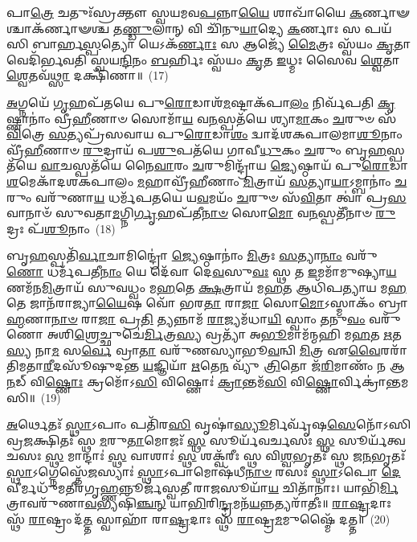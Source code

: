 𑌪𑌾\-\ul{𑌤𑍍𑌰𑍇} 𑌚𑌤𑍁𑌃᳴𑌸𑍍𑌰𑌕𑍍𑌤𑍗 𑌸𑍍𑌵𑌯𑌮𑌵\-\ul{𑌪}\-𑌨𑍍𑌨𑌾\-\ul{𑌯𑍈} 𑌶𑌾𑌖𑌾᳴𑌯𑍈 \ul{𑌕}\-𑌰𑍍𑌣𑌾𑍟𑌶𑍍𑌚𑌾\-𑌕᳴𑌰𑍍𑌣𑌾𑍟𑌶𑍍𑌚 𑌤\-\ul{𑌣𑍍𑌡𑍁}\-𑌲𑌾𑌨𑍍 𑌵𑌿 𑌚𑌿᳴𑌨𑍁\-\ul{𑌯𑌾}\-𑌦𑍍𑌯𑍇 \ul{𑌕}\-𑌰𑍍𑌣𑌾𑌃 𑌸 𑌪𑌯᳴𑌸𑌿 𑌬𑌾𑌰𑍍\mbox{}𑌹\-\ul{𑌸𑍍𑌪}\-𑌤𑍍𑌯𑍋 𑌯𑍇\-𑌽𑌕᳴\-\ul{𑌰𑍍𑌣𑌾𑌃} 𑌸 𑌆𑌜𑍍𑌯𑍇᳴ \ul{𑌮𑍈}\-𑌤𑍍𑌰𑌃 𑌸𑍍𑌵᳴𑌯𑌂 \ul{𑌕𑍃}\-𑌤𑌾 𑌵𑍇𑌦𑌿᳴𑌰𑍍𑌭𑌵𑌤𑌿 𑌸𑍍𑌵𑌯\-\ul{𑌨𑍍𑌦𑌿}\-𑌨𑌂 \ul{𑌬}\-𑌰𑍍\mbox{}𑌹𑌿𑌃 𑌸𑍍𑌵᳴𑌯𑌂 \ul{𑌕𑍃}\-𑌤 \ul{𑌇}\-𑌧𑍍𑌮𑌃 𑌸𑍈𑌵 \ul{𑌶𑍍𑌵𑍇}\-𑌤𑌾 \ul{𑌶𑍍𑌵𑍇}\-𑌤𑌵᳴\-\ul{𑌥𑍍𑌸𑌾} 𑌦𑌕𑍍𑌷𑌿᳴𑌣𑌾॥~(17)


{\anuvakamend[{\-\ul{𑌸𑌾}\-\-\ul{𑌵𑌿}\-𑌤𑍍𑌰𑌂 𑌦𑍍𑌵𑌾𑌦᳴𑌶\-𑌕𑌪𑌾\-\ul{𑌲}\-𑌮𑌾𑌶𑍍𑌵᳴\-\ul{𑌤𑍍𑌥𑍇} 𑌤𑍍𑌰𑌯᳴𑌸𑍍𑌤𑍍𑌰𑌿𑍞𑌶𑌚𑍍𑌚}]}%

\-\ul{𑌅}\-𑌗𑍍𑌨𑌯𑍇᳴ \ul{𑌗𑍃}\-𑌹𑌪᳴𑌤𑌯𑍇 𑌪𑍁\-\ul{𑌰𑍋}\-𑌡𑌾𑌶᳴\-\-\ul{𑌮}\-𑌷𑍍𑌟𑌾\-𑌕᳴𑌪𑌾\-\ul{𑌲𑌂} 𑌨𑌿𑌰𑍍𑌵᳴𑌪𑌤𑌿 \ul{𑌕𑍃}\-𑌷𑍍𑌣𑌾𑌨𑌾𑌂॑ 𑌵𑍍𑌰𑍀\-\ul{𑌹𑍀}\-𑌣𑌾𑍞 𑌸𑍋𑌮𑌾᳴\-\ul{𑌯} 𑌵\-\ul{𑌨}\-𑌸𑍍𑌪𑌤᳴𑌯𑍇 𑌶𑍍𑌯𑌾\-\ul{𑌮𑌾}\-𑌕𑌂 \ul{𑌚}\-𑌰𑍁𑍞 𑌸᳴\-\ul{𑌵𑌿}\-𑌤𑍍𑌰𑍇 \ul{𑌸}\-𑌤𑍍𑌯𑌪𑍍𑌰᳴𑌸𑌵𑌾𑌯 𑌪𑍁\-\ul{𑌰𑍋}\-𑌡𑌾\-\ul{𑌶𑌂} 𑌦𑍍𑌵𑌾𑌦᳴𑌶\-𑌕𑌪𑌾𑌲𑌮𑌾\-\ul{𑌶𑍂}\-𑌨𑌾𑌂 𑌵𑍍𑌰𑍀᳴\-\ul{𑌹𑍀}\-𑌣𑌾𑍞 \ul{𑌰𑍁}\-𑌦𑍍𑌰𑌾𑌯᳴ 𑌪\-\ul{𑌶𑍁}\-𑌪𑌤᳴𑌯𑍇 𑌗𑌾𑌵𑍀\-\ul{𑌧𑍁}\-𑌕𑌂 \ul{𑌚}\-𑌰𑍁𑌂 𑌬𑍃\-\ul{𑌹}\-𑌸𑍍𑌪𑌤᳴𑌯𑍇 \ul{𑌵𑌾}\-𑌚𑌸𑍍𑌪𑌤᳴𑌯𑍇 𑌨𑍈\-\ul{𑌵𑌾}\-𑌰𑌂 \ul{𑌚}\-𑌰𑍁𑌮𑌿𑌨𑍍𑌦𑍍𑌰𑌾᳴𑌯 \ul{𑌜𑍍𑌯𑍇}\-𑌷𑍍𑌠𑌾𑌯᳴ 𑌪𑍁\-\ul{𑌰𑍋}\-𑌡𑌾\-\ul{𑌶}\-𑌮𑍇𑌕𑌾᳴\-𑌦𑌶\-𑌕𑌪𑌾𑌲𑌂 \ul{𑌮}\-𑌹𑌾𑌵𑍍𑌰𑍀᳴𑌹𑍀𑌣𑌾𑌂 \ul{𑌮𑌿}\-𑌤𑍍𑌰𑌾𑌯᳴ \ul{𑌸}\-𑌤𑍍𑌯𑌾\-\ul{𑌯𑌾}\-\-𑌽𑌮𑍍𑌬𑌾𑌨𑌾𑌂॑ \ul{𑌚}\-𑌰𑍁𑌂 𑌵𑌰𑍁᳴𑌣𑌾\-\ul{𑌯} 𑌧𑌰𑍍𑌮᳴𑌪𑌤𑌯𑍇 𑌯\-\ul{𑌵}\-𑌮𑌯𑌂᳴ \ul{𑌚}\-𑌰𑍁𑍞 𑌸᳴\-\ul{𑌵𑌿}\-𑌤𑌾 𑌤𑍍𑌵𑌾॑ 𑌪𑍍𑌰\-\ul{𑌸}\-𑌵𑌾𑌨𑌾𑍞᳴ 𑌸𑍁𑌵𑌤𑌾\-\ul{𑌮}\-𑌗𑍍𑌨𑌿\-\ul{𑌰𑍍𑌗𑍃}\-𑌹𑌪᳴𑌤𑍀\-\ul{𑌨𑌾}\-\-\ul{𑍞} 𑌸𑍋\-\ul{𑌮𑍋} 𑌵\-\ul{𑌨}\-𑌸𑍍𑌪𑌤𑍀᳴𑌨𑌾𑍞 \ul{𑌰𑍁}\-𑌦𑍍𑌰𑌃 𑌪᳴\-\ul{𑌶𑍂}\-𑌨𑌾𑌂~(18)

𑌬𑍃\-\ul{𑌹}\-𑌸𑍍𑌪𑌤𑌿᳴\-\ul{𑌰𑍍𑌵𑌾}\-𑌚𑌾𑌮𑌿𑌨𑍍𑌦𑍍𑌰𑍋॑ \ul{𑌜𑍍𑌯𑍇}\-𑌷𑍍𑌠𑌾𑌨𑌾𑌂॑ \ul{𑌮𑌿}\-𑌤𑍍𑌰𑌃 \ul{𑌸}\-𑌤𑍍𑌯𑌾\-\ul{𑌨𑌾𑌂} 𑌵𑌰𑍁᳴\-\ul{𑌣𑍋} 𑌧𑌰𑍍𑌮᳴𑌪𑌤𑍀\-\ul{𑌨𑌾𑌂} 𑌯𑍇 𑌦𑍇᳴𑌵𑌾 𑌦𑍇\-\ul{𑌵}\-𑌸𑍁\-\ul{𑌵𑌃} 𑌸𑍍𑌥 𑌤 \ul{𑌇}\-𑌮𑌮𑌾᳴𑌮𑍁𑌷𑍍𑌯𑌾\-\ul{𑌯}\-𑌣𑌮᳴\-𑌨\-\ul{𑌮𑌿}\-𑌤𑍍𑌰𑌾𑌯᳴ 𑌸𑍁𑌵𑌧𑍍𑌵𑌂 𑌮\-\ul{𑌹}\-𑌤𑍇 \ul{𑌕𑍍𑌷}\-𑌤𑍍𑌰𑌾𑌯᳴ 𑌮\-\ul{𑌹}\-𑌤 𑌆𑌧𑌿᳴𑌪𑌤𑍍𑌯𑌾𑌯 𑌮\-\ul{𑌹}\-𑌤𑍇 𑌜𑌾𑌨᳴𑌰𑌾𑌜𑍍𑌯𑌾\-\ul{𑌯𑍈}\-𑌷 𑌵𑍋᳴ 𑌭𑌰\-\ul{𑌤𑌾} 𑌰𑌾\-\ul{𑌜𑌾} 𑌸𑍋\-\ul{𑌮𑍋}\-\-𑌽𑌸𑍍𑌮𑌾𑌕𑌂᳴ 𑌬𑍍𑌰𑌾\-\ul{𑌹𑍍𑌮}\-𑌣𑌾\-\ul{𑌨𑌾}\-\-\ul{𑍞} 𑌰𑌾\-\ul{𑌜𑌾} 𑌪𑍍𑌰\-\ul{𑌤𑌿} 𑌤𑍍𑌯𑌨𑍍𑌨𑌾𑌮᳴ \ul{𑌰𑌾}\-𑌜𑍍𑌯𑌮᳴𑌧𑌾\-\ul{𑌯𑌿} 𑌸𑍍𑌵𑌾𑌂 \ul{𑌤}\-𑌨𑍁\-\ul{𑌵𑌂} 𑌵𑌰𑍁᳴𑌣𑍋 𑌅𑌶𑌿\-\ul{𑌶𑍍𑌰𑍇}\-𑌚𑍍𑌛𑍁𑌚𑍇॑\-\ul{𑌰𑍍𑌮𑌿}\-𑌤𑍍𑌰\-\ul{𑌸𑍍𑌯} 𑌵𑍍𑌰𑌤𑍍𑌯𑌾᳴ 𑌅\-\ul{𑌭𑍂}\-𑌮𑌾𑌮᳴𑌨𑍍𑌮𑌹𑌿 𑌮\-\ul{𑌹}\-𑌤 \ul{𑌋}\-𑌤\-\ul{𑌸𑍍𑌯} 𑌨𑌾\-\ul{𑌮} 𑌸\-\ul{𑌰𑍍𑌵𑍇} 𑌵𑍍𑌰𑌾\-\ul{𑌤𑌾} 𑌵𑌰𑍁᳴𑌣𑌸𑍍𑌯𑌾𑌭𑍂\-\ul{𑌵}\-𑌨𑍍𑌵𑌿 \ul{𑌮𑌿}\-𑌤𑍍𑌰 𑌏\-\ul{𑌵𑍈}\-𑌰𑌰𑌾᳴𑌤𑌿𑌮𑌤𑌾\-\ul{𑌰𑍀}\-𑌦𑌸𑍂᳴𑌷𑍁𑌦𑌨𑍍𑌤 \ul{𑌯}\-𑌜𑍍𑌞𑌿𑌯𑌾᳴ \ul{𑌋}\-𑌤𑍇\-\ul{𑌨} 𑌵𑍍𑌯𑍁᳴ \ul{𑌤𑍍𑌰𑌿}\-𑌤𑍋 𑌜᳴\-\ul{𑌰𑌿}\-𑌮𑌾𑌣𑌂᳴ 𑌨 𑌆\-\ul{𑌨}\-𑌡𑍍 𑌵𑌿\-\ul{𑌷𑍍𑌣𑍋𑌃} 𑌕𑍍𑌰𑌮𑍋᳴\-𑌽\-\ul{𑌸𑌿} 𑌵𑌿𑌷𑍍𑌣𑍋𑌃॑ \ul{𑌕𑍍𑌰𑌾}\-𑌨𑍍𑌤𑌮᳴\-\ul{𑌸𑌿} 𑌵𑌿\-\ul{𑌷𑍍𑌣𑍋}\-𑌰𑍍𑌵𑌿𑌕𑍍𑌰𑌾॑𑌨𑍍𑌤𑌮𑌸𑌿॥~(19)

{\anuvakamend[{\-\ul{𑌪}\-\-\ul{𑌶𑍂}\-𑌨𑌾𑌂 𑌵𑍍𑌰𑌾\-\ul{𑌤𑌾𑌃} 𑌪𑌞𑍍𑌚᳴𑌵𑌿𑍞𑌶𑌤𑌿𑌶𑍍𑌚}]}%

\-\ul{𑌅}\-𑌰𑍍𑌥𑍇𑌤𑌃᳴ \ul{𑌸𑍍𑌥𑌾}\-\-𑌽𑌪𑌾𑌂 𑌪𑌤𑌿᳴𑌰\-\ul{𑌸𑌿} 𑌵𑍃𑌷𑌾॑\-\ul{𑌸𑍍𑌯𑍂}\-𑌰𑍍𑌮𑌿𑌰𑍍𑌵𑍃᳴𑌷\-\ul{𑌸𑍇}\-𑌨𑍋᳴\-𑌽𑌸𑌿 𑌵𑍍𑌰\-\ul{𑌜}\-𑌕𑍍𑌷𑌿𑌤𑌃᳴ 𑌸𑍍𑌥 \ul{𑌮}\-𑌰𑍁\-\ul{𑌤𑌾}\-𑌮𑍋𑌜𑌃᳴ \ul{𑌸𑍍𑌥} 𑌸𑍂𑌰𑍍𑌯᳴𑌵𑌰𑍍𑌚𑌸𑌃 \ul{𑌸𑍍𑌥} 𑌸𑍂𑌰𑍍𑌯᳴𑌤𑍍𑌵𑌚𑌸𑌃 \ul{𑌸𑍍𑌥} 𑌮𑌾𑌨𑍍𑌦𑌾𑌃॑ \ul{𑌸𑍍𑌥} 𑌵𑌾𑌶𑌾𑌃॑ \ul{𑌸𑍍𑌥} 𑌶𑌕𑍍𑌵᳴𑌰𑍀𑌃 𑌸𑍍𑌥 𑌵𑌿\-\ul{𑌶𑍍𑌵}\-𑌭𑍃𑌤𑌃᳴ 𑌸𑍍𑌥 𑌜\-\ul{𑌨}\-𑌭𑍃𑌤𑌃᳴ \ul{𑌸𑍍𑌥𑌾}\-\-𑌽𑌗𑍍𑌨𑍇𑌸𑍍𑌤𑍇᳴\-\ul{𑌜}\-𑌸𑍍𑌯𑌾𑌃॑ \ul{𑌸𑍍𑌥𑌾}\-\-𑌽𑌪𑌾𑌮𑍋𑌷᳴𑌧𑍀\-\ul{𑌨𑌾}\-\-\ul{𑍞} 𑌰𑌸𑌃᳴ \ul{𑌸𑍍𑌥𑌾}\-\-𑌽𑌪𑍋 \ul{𑌦𑍇}\-𑌵𑍀𑌰𑍍𑌮𑌧𑍁᳴𑌮𑌤𑍀𑌰𑌗𑍃\-\ul{𑌹𑍍𑌣}\-𑌨𑍍𑌨𑍂𑌰𑍍𑌜᳴𑌸𑍍𑌵𑌤𑍀 𑌰𑌾\-\ul{𑌜}\-𑌸𑍂𑌯𑌾᳴\-\ul{𑌯} 𑌚𑌿𑌤𑌾᳴𑌨𑌾𑌃। 𑌯𑌾𑌭𑌿᳴\-\ul{𑌰𑍍𑌮𑌿}\-𑌤𑍍𑌰𑌾𑌵𑌰𑍁᳴𑌣𑌾\-\ul{𑌵}\-𑌭𑍍𑌯𑌷𑌿᳴\-\ul{𑌞𑍍𑌚}\-\-\ul{𑌨𑍍} 𑌯𑌾\-\ul{𑌭𑌿}\-𑌰𑌿\-\ul{𑌨𑍍𑌦𑍍𑌰}\-𑌮𑌨᳴\-\ul{𑌯}\-𑌨𑍍𑌨𑌤𑍍𑌯𑌰𑌾᳴𑌤𑍀𑌃॥ \ul{𑌰𑌾}\-\-\ul{𑌷𑍍𑌟𑍍𑌰}\-𑌦𑌾𑌃 𑌸𑍍𑌥᳴ \ul{𑌰𑌾}\-𑌷𑍍𑌟𑍍𑌰𑌂 𑌦᳴\-\ul{𑌤𑍍𑌤} 𑌸𑍍𑌵𑌾𑌹𑌾᳴ 𑌰𑌾\-\ul{𑌷𑍍𑌟𑍍𑌰}\-𑌦𑌾𑌃 𑌸𑍍𑌥᳴ \ul{𑌰𑌾}\-𑌷𑍍𑌟𑍍𑌰\-\ul{𑌮}\-𑌮𑍁𑌷𑍍𑌮𑍈᳴ 𑌦𑌤𑍍𑌤॥~(20)

